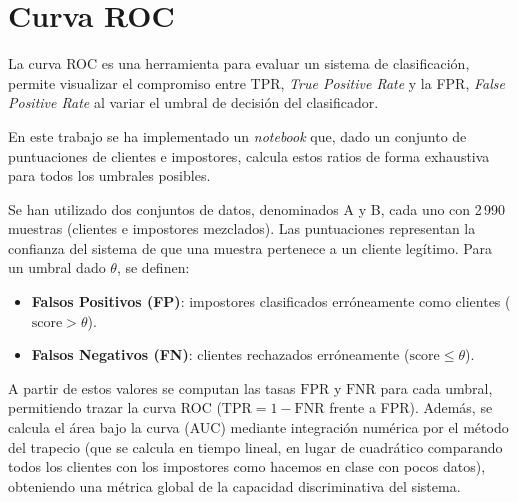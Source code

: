 \documentclass[11pt,spanish,listoffigures,listoftables]{tfgetsinf}
\begin{document}
\chapter{Curva ROC}

La curva ROC es una herramienta para evaluar un sistema de clasificación, permite visualizar el compromiso entre TPR, \textit{True Positive Rate} y la FPR, \textit{False Positive Rate} al variar el umbral de decisión del clasificador. 

En este trabajo se ha implementado un \textit{notebook} que, dado un conjunto de puntuaciones de clientes e impostores, calcula estos ratios de forma exhaustiva para todos los umbrales posibles.

Se han utilizado dos conjuntos de datos, denominados A y B, cada uno con 2\,990 muestras (clientes e impostores mezclados). Las puntuaciones representan la confianza del sistema de que una muestra pertenece a un cliente legítimo. Para un umbral dado $\theta$, se definen:

\begin{itemize}
    \item \textbf{Falsos Positivos (FP)}: impostores clasificados erróneamente como clientes ($\text{score} > \theta$).
    \item \textbf{Falsos Negativos (FN)}: clientes rechazados erróneamente ($\text{score} \leq \theta$).
\end{itemize}

A partir de estos valores se computan las tasas $\text{FPR}$ y $\text{FNR}$ para cada umbral, permitiendo trazar la curva ROC ($\text{TPR} = 1 - \text{FNR}$ frente a FPR). Además, se calcula el área bajo la curva (AUC) mediante integración numérica por el método del trapecio (que se calcula en tiempo lineal, en lugar de cuadrático comparando todos los clientes con los impostores como hacemos en clase con pocos datos), obteniendo una métrica global de la capacidad discriminativa del sistema.
\end{document}
